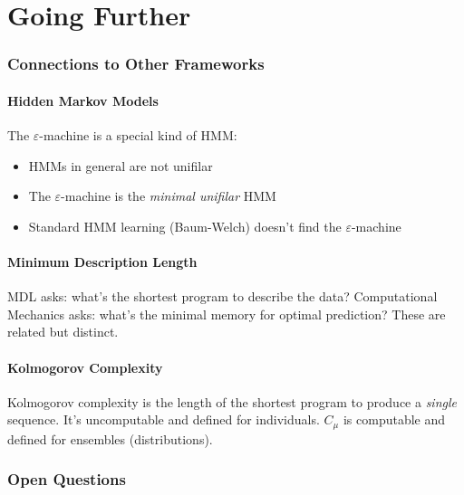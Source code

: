 \documentclass[11pt,a4paper]{article}
\theoremstyle{definition}
\theoremstyle{plain}
\newcommand{\eps}{\varepsilon}
\newcommand{\Cmu}{C_\mu}
\begin{document}
\part{Going Further}

\section{Connections to Other Frameworks}
\label{sec:connections}

\subsection{Hidden Markov Models}

The $\eps$-machine is a special kind of HMM:
\begin{itemize}
    \item HMMs in general are not unifilar
    \item The $\eps$-machine is the \emph{minimal unifilar} HMM
    \item Standard HMM learning (Baum-Welch) doesn't find the $\eps$-machine
\end{itemize}

\subsection{Minimum Description Length}

MDL asks: what's the shortest program to describe the data? Computational Mechanics asks: what's the minimal memory for optimal prediction? These are related but distinct.

\subsection{Kolmogorov Complexity}

Kolmogorov complexity is the length of the shortest program to produce a \emph{single} sequence. It's uncomputable and defined for individuals. $\Cmu$ is computable and defined for ensembles (distributions).

\section{Open Questions}
\label{sec:open-questions}
\end{document}
